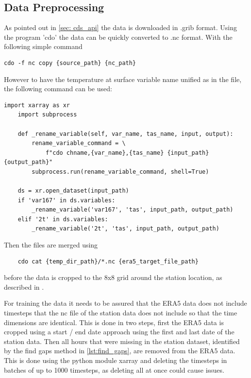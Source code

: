 \subsection{Data Preprocessing}

As pointed out in \autoref{sec: cds_api} the data is downloaded in .grib format. Using the program 'cdo' the data can be quickly converted to .nc format. With the following simple command

\begin{lstlisting}
cdo -f nc copy {source_path} {nc_path}
\end{lstlisting}

However to have the temperature at surface variable name unified as  in the  file, the following command can be used:

\begin{lstlisting}[caption=Renaming Variable in \code{NetCDF} File, label=lst:rename_variable]
    import xarray as xr
    import subprocess

    def _rename_variable(self, var_name, tas_name, input, output):
        rename_variable_command = \
            f"cdo chname,{var_name},{tas_name} {input_path} {output_path}"
        subprocess.run(rename_variable_command, shell=True)
        
    ds = xr.open_dataset(input_path)
    if 'var167' in ds.variables:
        _rename_variable('var167', 'tas', input_path, output_path)
    elif '2t' in ds.variables:
        _rename_variable('2t', 'tas', input_path, output_path)

\end{lstlisting}

Then the files are merged using 

\begin{lstlisting}
    cdo cat {temp_dir_path}/*.nc {era5_target_file_path}
\end{lstlisting}

before the data is cropped to the 8x8 grid around the station location, as described in .

For training the data it needs to be assured that the ERA5 data does not include timesteps that the nc file of the station data does not include so that the time dimensions are identical. This is done in two steps, first the ERA5 data is cropped using a start / end date approach using the first and last date of the station data. Then all hours that were missing in the station dataset, identified by the find gaps method in \autoref{lst:find_gaps}, are removed from the ERA5 data. This is done using the python module xarray and deleting the timesteps in batches of up to 1000 timesteps, as deleting all at once could cause issues.

